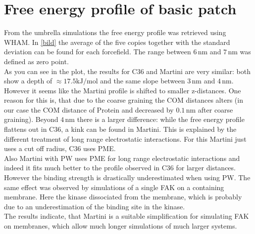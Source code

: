 \section{Free energy profile of basic patch}
From the umbrella simulations the free energy profile was retrieved using \gromacs{} WHAM. In \autoref{bild} the average of the five copies together with the standard deviation can be found for each forcefield. The range between $6\,\si{\nano\metre}$ and $7\,\si{\nano\metre}$ was defined as zero point.\\
As you can see in the plot, the results for C36 and Martini are very similar: both show a depth of $\approx 17.5 \si{\kilo\joule/\mole}$ and the same slope between $3\,\si{\nano\metre}$ and $4\,\si{\nano\metre}$. However it seems like the Martini profile is shifted to smaller z-distances. One reason for this is, that due to the coarse graining the COM distances alters (in our case the COM distance of Protein and \pip{} decreased by $0.1\,\si{\nano\metre}$ after coarse graining). Beyond $4\,\si{\nano\metre}$ there is a larger difference: while the free energy profile flattens out in C36, a kink can be found in Martini. This is explained by the different treatment of long range electrostatic interactions. For this Martini just uses a cut off radius, C36 uses PME.\\
Also Martini with PW uses PME for long range electrostatic interactions and indeed it fits much better to the profile observed in C36 for larger distances. However the binding strength is drastically underestimated when using PW. The same effect was observed by simulations of a single FAK on a \pip{} containing membrane. Here the kinase dissociated from the membrane, which is probably due to an underestimation of the \pip{} binding site in the kinase.\\
The results indicate, that Martini is a suitable simplification for simulating FAK on membranes, which allow much longer simulations of much larger systems.